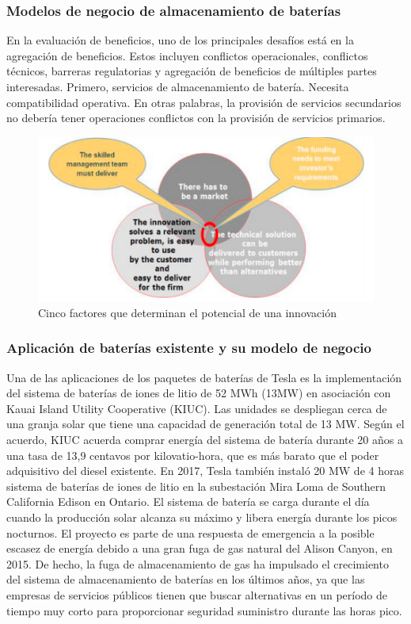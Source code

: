 \documentclass[10pt]{beamer}
\begin{document}
\begin{frame}
\frametitle{Modelos de negocio de almacenamiento de baterías}
En la evaluación de beneficios, uno de los principales desafíos está en la agregación de beneficios. Estos incluyen conflictos operacionales,
conflictos técnicos, barreras regulatorias y agregación de beneficios de múltiples partes interesadas. Primero, servicios de almacenamiento de batería. Necesita compatibilidad operativa. En otras palabras, la provisión de servicios secundarios no debería tener operaciones
conflictos con la provisión de servicios primarios.
\begin{figure}[H]
\centering
\includegraphics[scale=0.38]{img1.png}
\caption{Cinco factores que determinan el potencial de una innovación}
\end{figure}
\end{frame}
\begin{frame}
\frametitle{Aplicación de baterías existente y su modelo de negocio}
Una de las aplicaciones de los paquetes de baterías de Tesla es la implementación del sistema de baterías de iones de litio de 52 MWh (13MW)
en asociación con Kauai Island Utility Cooperative (KIUC). Las unidades se despliegan cerca de una granja solar que tiene una capacidad de generación total de 13 MW. Según el acuerdo, KIUC acuerda comprar energía del sistema de batería durante 20 años a una tasa de 13,9 centavos por kilovatio-hora, que es más barato que el poder adquisitivo del diesel existente.
En 2017, Tesla también instaló 20 MW de 4 horas sistema de baterías de iones de litio en la subestación Mira Loma de Southern California Edison en Ontario. El sistema de batería se carga durante el día cuando la producción solar alcanza su máximo y libera energía durante los picos nocturnos. El proyecto es parte de una respuesta de emergencia a la posible escasez de energía debido a una gran fuga de gas natural del Alison Canyon, en 2015. De hecho, la fuga de almacenamiento de gas ha impulsado el crecimiento del sistema de almacenamiento de baterías en los últimos años, ya que las empresas de servicios públicos tienen que buscar alternativas en un período de tiempo muy corto para proporcionar seguridad
suministro durante las horas pico. 
\end{frame}
\end{document}
